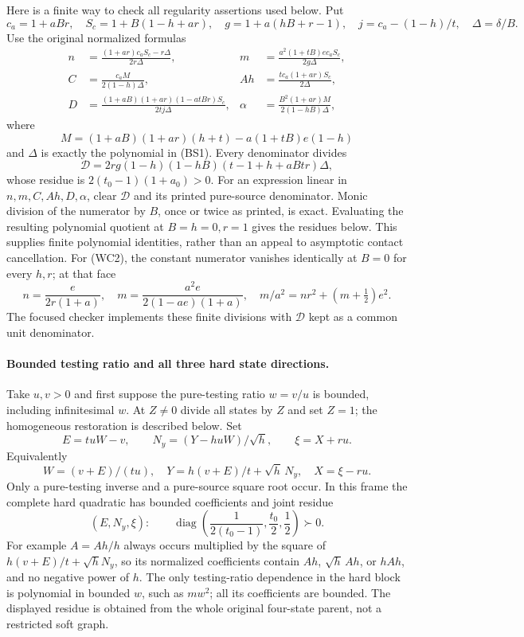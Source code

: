 Here is a finite way to check all regularity assertions used below.
Put
\[
 c_a=1+aBr,\quad S_c=1+B(1-h+ar),\quad
 g=1+a(hB+r-1),\quad j=c_a-(1-h)/t,\quad \Delta=\delta/B.
\]
Use the original normalized formulas
\[
\begin{aligned}
 n&=\frac{(1+ar)c_aS_c-r\Delta}{2r\Delta},&
 m&=\frac{a^2(1+tB)e c_aS_c}{2g\Delta},\\
 C&=\frac{c_aM}{2(1-h)\Delta},&
 Ah&=\frac{t c_a(1+ar)S_c}{2\Delta},\\
 D&=\frac{(1+aB)(1+ar)(1-atBr)S_c}{2tj\Delta},&
 \alpha&=\frac{B^2(1+ar)M}{2(1-hB)\Delta},
\end{aligned}                                                   \tag{WC3}
\]
where
\[
 M=(1+aB)(1+ar)(h+t)-a(1+tB)e(1-h)
\]
and $\Delta$ is exactly the polynomial in (BS1).
Every denominator divides
\[
 \mathcal D=2r g(1-h)(1-hB)(t-1+h+aBtr)\Delta,
\]
whose residue is $2(t_0-1)(1+a_0)>0$. For an expression
linear in $n,m,C,Ah,D,\alpha$, clear $\mathcal D$ and its
printed pure-source denominator. Monic division of the numerator by
$B$, once or twice as printed, is exact. Evaluating the resulting
polynomial quotient at $B=h=0,r=1$ gives the residues below.
This supplies finite polynomial identities, rather than an appeal
to asymptotic contact cancellation. For (WC2), the constant numerator
vanishes identically at $B=0$ for every $h,r$; at that face
\[
 n=\frac e{2r(1+a)},\quad
 m=\frac{a^2e}{2(1-ae)(1+a)},\quad
 m/a^2=nr^2+(m+\tfrac12)e^2.
\]
The focused checker implements these finite divisions with
$\mathcal D$ kept as a common unit denominator.

\paragraph{Bounded testing ratio and all three hard state directions.}
Take $u,v>0$ and first suppose the pure-testing ratio $w=v/u$ is
bounded, including infinitesimal $w$. At $Z\ne0$ divide all states
by $Z$ and set $Z=1$; the homogeneous restoration is described below.
Set
\[
 E=tuW-v,\qquad N_y=(Y-huW)/\sqrt h,\qquad
 \xi=X+ru.                                                   \tag{WC4}
\]
Equivalently
\[
 W=(v+E)/(tu),\quad Y=h(v+E)/t+\sqrt h\,N_y,
 \quad X=\xi-ru.
\]
Only a pure-testing inverse and a pure-source square root occur.
In this frame the complete hard quadratic has bounded coefficients
and joint residue
\[
 (E,N_y,\xi):\qquad
 \operatorname{diag}\left(\frac1{2(t_0-1)},\frac{t_0}2,
                                      \frac12\right)\succ0.  \tag{WC5}
\]
For example $A=Ah/h$ always occurs multiplied by the square of
$h(v+E)/t+\sqrt h N_y$, so its normalized coefficients contain
$Ah$, $\sqrt h\,Ah$, or $hAh$, and no negative power of $h$.
The only testing-ratio dependence in the hard block is polynomial
in bounded $w$, such as $mw^2$; all its coefficients are bounded.
The displayed residue is obtained from the whole original four-state
parent, not a restricted soft graph.

